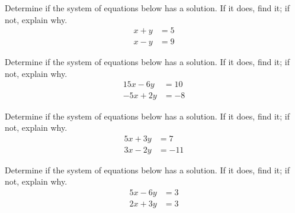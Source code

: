 \documentclass[11pt,letterpaper]{article}
\begin{document}

 Determine if the system of equations below has a solution. If it does, find it; if not, explain why. \pspace
	\[
	\begin{aligned}
	x + y&= 5 \\
	x - y&= 9
	\end{aligned}
	\]





\newpage





 Determine if the system of equations below has a solution. If it does, find it; if not, explain why. \pspace
	\[
	\begin{aligned}
	15x - 6y&= 10 \\
	-5x + 2y&= -8
	\end{aligned}
	\]





\newpage





 Determine if the system of equations below has a solution. If it does, find it; if not, explain why. \pspace
	\[
	\begin{aligned}
	5x + 3y&= 7 \\
	3x - 2y&= -11
	\end{aligned}
	\]





\newpage





 Determine if the system of equations below has a solution. If it does, find it; if not, explain why. \pspace
	\[
	\begin{aligned}
	5x - 6y&= 3 \\
	2x + 3y&= 3
	\end{aligned}
	\]


\end{document}
